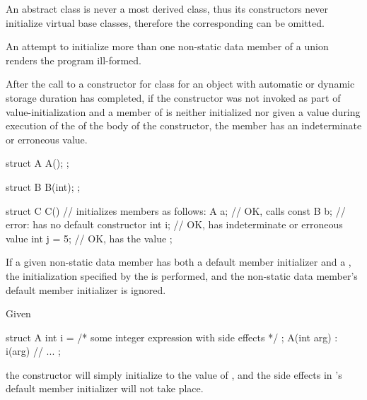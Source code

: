 \begin{note}
An abstract class is never a most derived
class, thus its constructors never initialize virtual base classes, therefore the
corresponding  can be omitted.
\end{note}
An attempt to initialize more than one non-static data member of a union renders the
program ill-formed.
%
%
\begin{note}
After the call to a constructor for class
for an object with automatic or dynamic storage duration
has completed, if
the constructor was not invoked as part of value-initialization and
a member of
is neither initialized nor
given a value
during execution of the  of the body of the constructor,
the member has an indeterminate or erroneous value.
\end{note}
\begin{example}
\begin{codeblock}
struct A {
  A();
};

struct B {
  B(int);
};

struct C {
  C() { }               // initializes members as follows:
  A a;                  // OK, calls 
  const B b;            // error:  has no default constructor
  int i;                // OK,  has indeterminate or erroneous value
  int j = 5;            // OK,  has the value 
};
\end{codeblock}
\end{example}

\pnum
If a given non-static data member has both a default member initializer
and a , the initialization specified by the
 is performed, and the non-static data member's
default member initializer is ignored.
\begin{example}
Given
\begin{codeblock}
struct A {
  int i = /* some integer expression with side effects */ ;
  A(int arg) : i(arg) { }
  // ...
};
\end{codeblock}
the  constructor will simply initialize  to the value of
, and the
%
side effects in 's default member initializer
will not take place.
\end{example}

